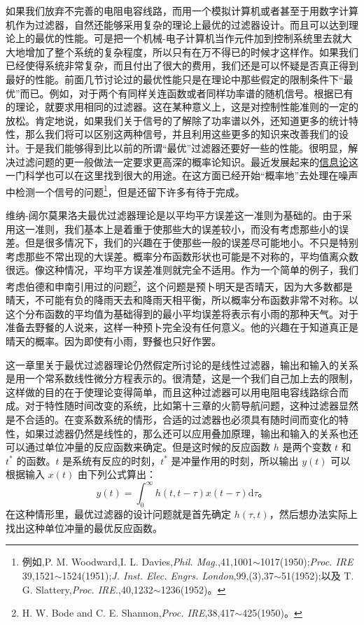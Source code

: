 如果我们放弃不完善的电阻电容线路，而用一个模拟计算机或者甚至于用数字计算机作为过滤器，自然还能够采用复杂的理论上最优的过滤器设计。而且可以达到理论上的最优的性能。可是把一个机械-电子计算机当作元件加到控制系统里去就大大地增加了整个系统的复杂程度，所以只有在万不得已的时候才这样作。如果我们已经使得系统非常复杂，而且付出了很大的费用，我们还是可以怀疑是否真正得到最好的性能。前面几节讨论过的最优性能只是在理论中那些假定的限制条件下“最优”而已。例如，对于两个有同样关连函数或者同样功率谱的随机信号。根据已有的理论，就要求用相同的过滤器。这在某种意义上，这是对控制性能准则的一定的放松。肯定地说，如果我们关于信号的了解除了功率谱以外，还知道更多的统计特性，那么我们将可以区别这两种信号，并且利用这些更多的知识来改善我们的设计。于是我们能够得到比以前的所谓“最优”过滤器还要好一些的性能。很明显，解决过滤问题的更一般做法一定要求更高深的概率论知识。最近发展起来的\underline{信息论}这一门科学也可以在这里找到很大的用途。在这方面已经开始“概率地”去处理在噪声中检测一个信号的问题\footnote{例如,P. M. Woodward,I. L. Davies,\textit{Phil. Mag.},41,1001$\sim$1017(1950);\textit{Proc. IRE} 39,1521$\sim$1524(1951);\textit{J. Inst. Elec. Engrs. London},99,(3),37$\sim$51(1952);以及 T. G. Slattery,\textit{Proc. IRE.},40,1232$\sim$1236(1952)。}，但是还留下许多有待于完成。

维纳-阔尔莫果洛夫最优过滤器理论是以平均平方误差这一准则为基础的。由于采用这一准则，我们基本上是着重于使那些大的误差较小，而没有考虑那些小的误差。但是很多情况下，我们的兴趣在于使那些一般的误差尽可能地小。不只是特别考虑那些不常出现的大误差。概率分布函数形状也可能是不对称的，平均值离众数很远。像这种情况，平均平方误差准则就完全不适用。作为一个简单的例子，我们考虑伯德和申南引用过的问题\footnote{H. W. Bode and C. E. Shannon,\textit{Proc. IRE},38,417$\sim$425(1950)。}，这个问题是预卜明天是否晴天，因为大多数都是晴天，不可能有负的降雨天去和降雨天相平衡，所以概率分布函数非常不对称。以这个分布函数的平均值为基础得到的最小平均误差将表示有小雨的那种天气。对于准备去野餐的人说来，这样一种预卜完全没有任何意义。他的兴趣在于知道真正是晴天的概率。因为即使有小雨，野餐也只好作罢。

这一章里关于最优过滤器理论仍然假定所讨论的是线性过滤器，输出和输入的关系是用一个常系数线性微分方程表示的。很清楚，这是一个我们自己加上去的限制，这样做的目的在于使理论变得简单，而且这种过滤器可以用电阻电容线路综合而成。对于特性随时间改变的系统，比如第十三章的火箭导航问题，这种过滤器显然是不合适的。在变系数系统的情形，合适的过滤器也必须具有随时间而变化的特性，如果过滤器仍然是线性的，那么还可以应用叠加原理，输出和输入的关系也还可以通过单位冲量的反应函数来确定。但是这时候的反应函数 $h$ 是两个变数 $t$ 和 $t^*$ 的函数。$t$ 是系统有反应的时刻，$t^*$ 是冲量作用的时刻，所以输出 $y(t)$ 可以根据输入 $x(t)$ 由下列公式算出：
\begin{equation}
y(t) = \int_{0}^{\infty} h(t,t-\tau)x(t-\tau)\mathrm{d}\tau。
\label{eq:ch16_time_varying_filter_output}
\end{equation}
在这种情形里，最优过滤器的设计问题就是首先确定 $h(\tau,t)$，然后想办法实际上找出这种单位冲量的最优反应函数。

